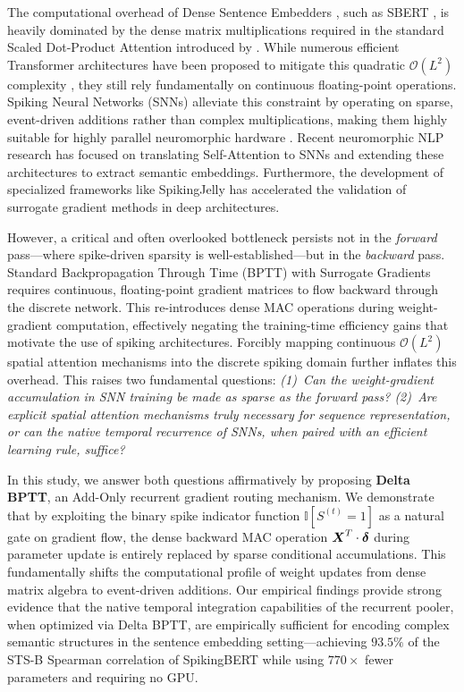 \documentclass[10pt]{article} %
\begin{document}
The computational overhead of Dense Sentence Embedders \citep{devlin2018bert}, such as SBERT \citep{reimers2019sentence}, is heavily dominated by the dense matrix multiplications required in the standard Scaled Dot-Product Attention introduced by \citet{vaswani2017attention}. While numerous efficient Transformer architectures have been proposed to mitigate this quadratic $\mathcal{O}(L^2)$ complexity \citep{tay2022efficient}, they still rely fundamentally on continuous floating-point operations. Spiking Neural Networks (SNNs) alleviate this constraint by operating on sparse, event-driven additions rather than complex multiplications, making them highly suitable for highly parallel neuromorphic hardware \citep{roy2019towards}. Recent neuromorphic NLP research has focused on translating Self-Attention to SNNs \citep{li2022spikeformer, zhu2023spikegpt} and extending these architectures to extract semantic embeddings. Furthermore, the development of specialized frameworks like SpikingJelly \citep{fang2023spikingjelly} has accelerated the validation of surrogate gradient methods in deep architectures.

However, a critical and often overlooked bottleneck persists not in the \textit{forward} pass---where spike-driven sparsity is well-established---but in the \textit{backward} pass. Standard Backpropagation Through Time (BPTT) with Surrogate Gradients \citep{neftci2019surrogate} requires continuous, floating-point gradient matrices to flow backward through the discrete network. This re-introduces dense MAC operations during weight-gradient computation, effectively negating the training-time efficiency gains that motivate the use of spiking architectures. Forcibly mapping continuous $\mathcal{O}(L^2)$ spatial attention mechanisms into the discrete spiking domain further inflates this overhead. This raises two fundamental questions: \textit{(1)~Can the weight-gradient accumulation in SNN training be made as sparse as the forward pass? (2)~Are explicit spatial attention mechanisms truly necessary for sequence representation, or can the native temporal recurrence of SNNs, when paired with an efficient learning rule, suffice?}

In this study, we answer both questions affirmatively by proposing \textbf{Delta BPTT}, an Add-Only recurrent gradient routing mechanism. We demonstrate that by exploiting the binary spike indicator function $\mathbb{I}[S^{(t)} = 1]$ as a natural gate on gradient flow, the dense backward MAC operation $\boldsymbol{X}^T \cdot \boldsymbol{\delta}$ during parameter update is entirely replaced by sparse conditional accumulations. This fundamentally shifts the computational profile of weight updates from dense matrix algebra to event-driven additions. Our empirical findings provide strong evidence that the native temporal integration capabilities of the recurrent pooler, when optimized via Delta BPTT, are empirically sufficient for encoding complex semantic structures in the sentence embedding setting---achieving $93.5\%$ of the STS-B Spearman correlation of SpikingBERT \citep{bal2024spikingbert} while using $770\times$ fewer parameters and requiring no GPU.
\end{document}
